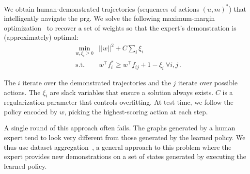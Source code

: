 We obtain human-demonstrated trajectories (sequences of actions $(u,
m)^{*}$) that intelligently navigate the {\sc prg}. We solve the
following maximum-margin optimization~\cite{taskar2005learning} to
recover a set of weights so that the expert's demonstration is
(approximately) optimal:
\begin{align*}
&\min_{w, \xi_i \geq 0} & ||w||^2 + C \sum_i \xi_i\\
&\text{s.t.} & w^{\top}f^*_i \geq w^{\top}f_{ij} + 1 - \xi_{i}\ \forall i, j \ .
\end{align*}

The $i$ iterate over the demonstrated trajectories and the $j$ iterate
over possible actions. The $\xi_{i}$ are slack variables that ensure
a solution always exists. $C$ is a regularization parameter that
controls overfitting. At test time, we follow the policy encoded by
$w$, picking the highest-scoring action at each step.

A single round of this approach often fails. The graphs generated by a
human expert tend to look very different from those generated by
the learned policy. We thus use dataset
aggregation~\cite{dagger}, a general approach to this problem where
the expert provides new demonstrations on a set of states generated by
executing the learned policy.

